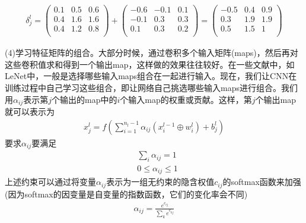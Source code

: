             \begin{align*}
            \delta_j^l =
            \begin{pmatrix}
            0.1 & 0.5 & 0.6\\
            0.4 & 1.6 & 1.6\\
            0.4 & 1.2 & 0.8\\
            \end{pmatrix}
            +
            \begin{pmatrix}
            -0.6 & -0.1 & 0.1\\
            -0.1 & 0.3 & 0.3\\
            0.1 & 0.3 & 0.2\\
            \end{pmatrix}
            =
             \begin{pmatrix}
            -0.5 & 0.4 & 0.9\\
            0.3 & 1.9 & 1.9\\
            0.5 & 1.5 & 1\\
            \end{pmatrix}
            \end{align*}
            \par
            (4)学习特征矩阵的组合。大部分时候，通过卷积多个输入矩阵(maps)，然后再对这些卷积值求和得到一个输出map，这样做的效果往往较好。在一些文献中，如LeNet中，一般是选择哪些输入maps组合在一起进行输入。现在，我们让CNN在训练过程中自己学习这些组合，即让网络自己挑选哪些输入maps进行组合。我们用$\alpha_{ij}$表示第$j$个输出的map中的$i$个输入map的权重或贡献。这样，第$j$个输出map就可以表示为
            \begin{align*}
            x_j^l =f \left( \sum_{i=1}^{n_l-1} \alpha_{ij}(x_i^{l-1}\oplus w_i^l) + b_j^l \right)
            \end{align*}
            要求$\alpha_{ij}$要满足
            \begin{align*}
            &\sum_i \alpha_{ij} = 1\\
            &0 \leqslant \alpha_{ij} \leqslant 1
            \end{align*}
            上述约束可以通过将变量$\alpha_{ij}$表示为一组无约束的隐含权值$c_{ij}$的softmax函数来加强(因为softmax的因变量是自变量的指数函数，它们的变化率会不同)
            \begin{align*}
            \alpha_{ij} = \frac{e^{c_{ij}}}{\sum_ke^{c_{kj}}}
            \end{align*}
            \par
